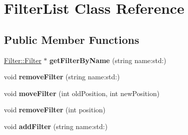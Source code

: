 \hypertarget{classFilter_1_1FilterList}{}\section{Filter\+List Class Reference}
\label{classFilter_1_1FilterList}
\subsection*{Public Member Functions}
\begin{DoxyCompactItemize}
\item 
\hypertarget{classFilter_1_1FilterList_a5725a35bff310ffc9948e98e2c92906a}{}\hyperlink{classFilter_1_1Filter}{Filter\+::\+Filter} $\ast$ {\bfseries get\+Filter\+By\+Name} (string name\+:std\+:)\label{classFilter_1_1FilterList_a5725a35bff310ffc9948e98e2c92906a}

\item 
\hypertarget{classFilter_1_1FilterList_aa4b065915c41845aa7c58528dfcb1665}{}void {\bfseries remove\+Filter} (string name\+:std\+:)\label{classFilter_1_1FilterList_aa4b065915c41845aa7c58528dfcb1665}

\item 
\hypertarget{classFilter_1_1FilterList_a13c4ca4bd21b65ab2e2f01556338d095}{}void {\bfseries move\+Filter} (int old\+Position, int new\+Position)\label{classFilter_1_1FilterList_a13c4ca4bd21b65ab2e2f01556338d095}

\item 
\hypertarget{classFilter_1_1FilterList_a3cd55a8f60d5021235199170937644c5}{}void {\bfseries remove\+Filter} (int position)\label{classFilter_1_1FilterList_a3cd55a8f60d5021235199170937644c5}

\item 
\hypertarget{classFilter_1_1FilterList_a0fd61eb6483e3c34ed6deeef3f5951e1}{}void {\bfseries add\+Filter} (string name\+:std\+:)\label{classFilter_1_1FilterList_a0fd61eb6483e3c34ed6deeef3f5951e1}

\end{DoxyCompactItemize}
